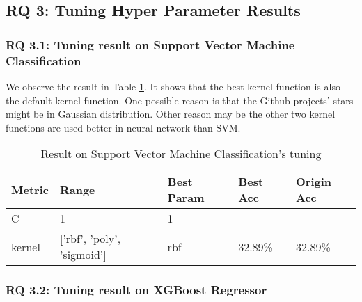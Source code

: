 \subsection{RQ 3: Tuning Hyper Parameter Results}
\subsubsection{RQ 3.1: Tuning result on Support Vector Machine Classification}
We observe the result in Table \ref{tblRQ31}. It shows that the best kernel function is also the default kernel function. One possible reason is that the Github projects' stars might be in Gaussian distribution. Other reason may be the other two kernel functions are used better in neural network than SVM. 

\begin{table}[]
\small
\begin{tabular}{|l|l|l|l|l|}
\hline
{\color[HTML]{000000} \textbf{Metric}} & {\color[HTML]{000000} \textbf{Range}}                 & {\color[HTML]{000000} \textbf{Best Param}} & {\color[HTML]{000000} \textbf{Best Acc}}         & {\color[HTML]{000000} \textbf{Origin Acc}}       \\ \hline
{\color[HTML]{000000} C}               & {\color[HTML]{000000} 1}                              & {\color[HTML]{000000} 1}                   & {\color[HTML]{000000} }                          & {\color[HTML]{000000} }                          \\ \cline{1-3}
{\color[HTML]{000000} kernel}          & {\color[HTML]{000000} {[}'rbf', 'poly', 'sigmoid'{]}} & {\color[HTML]{000000} rbf}                 & \multirow{-2}{*}{{\color[HTML]{000000} 32.89\%}} & \multirow{-2}{*}{{\color[HTML]{000000} 32.89\%}} \\ \hline
\end{tabular}
\label{tblRQ31}
\caption{Result on Support Vector Machine Classification's tuning}
\end{table}

\subsubsection{RQ 3.2: Tuning result on XGBoost Regressor}


